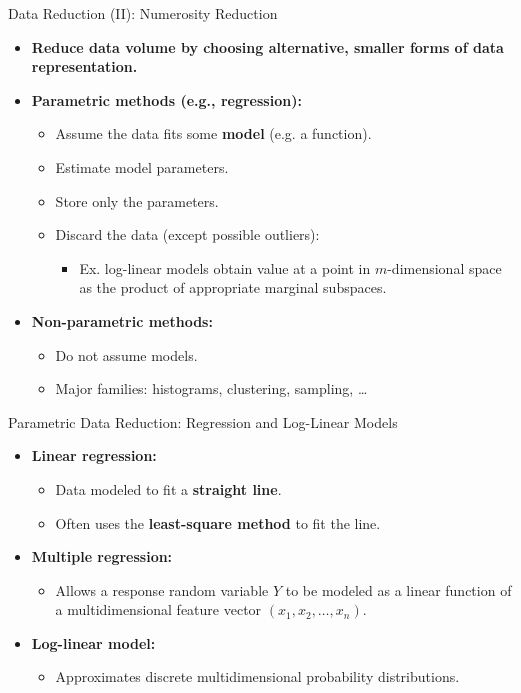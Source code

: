 \begin{frame}{Data Reduction (II): Numerosity Reduction}
	\begin{itemize}
		\item \textbf{Reduce data volume by choosing alternative, 
		{\color{airforceblue}smaller} forms of data representation.}
		\item \textbf{{\color{airforceblue}Parametric} methods (e.g., 
		regression):}
		\begin{itemize}
			\item Assume the data fits some 
			\textbf{{\color{airforceblue}model}} (e.g. a function).
			\item Estimate model parameters.
			\item Store only the parameters.
			\item Discard the data (except possible outliers):
			\begin{itemize}
				\item Ex. log-linear models obtain value at a point in 
				$m$-dimensional space as the product of appropriate marginal 
				subspaces.
			\end{itemize}
		\end{itemize}
		\item \textbf{{\color{airforceblue}Non-parametric} methods:}
		\begin{itemize}
			\item Do not assume models.
			\item Major families: histograms, clustering, sampling, \ldots
		\end{itemize}
	\end{itemize}
\end{frame}

\begin{frame}{Parametric Data Reduction: Regression and Log-Linear Models}
	\begin{itemize}
		\item \textbf{Linear regression:}
		\begin{itemize}
			\item Data modeled to fit a \textbf{{\color{airforceblue}straight 
			line}}.
			\item Often uses the \textbf{{\color{airforceblue}least-square 
			method}} to fit the line.
		\end{itemize}
		\item \textbf{Multiple regression:}
		\begin{itemize}
			\item Allows a response random variable $Y$ to be modeled as a 
			linear function of a multidimensional feature vector $(x_1, 
			x_2,\ldots, x_n)$.
		\end{itemize}
		\item \textbf{Log-linear model:}
		\begin{itemize}
			\item Approximates discrete multidimensional probability 
			distributions.
		\end{itemize}
	\end{itemize}
\end{frame}

